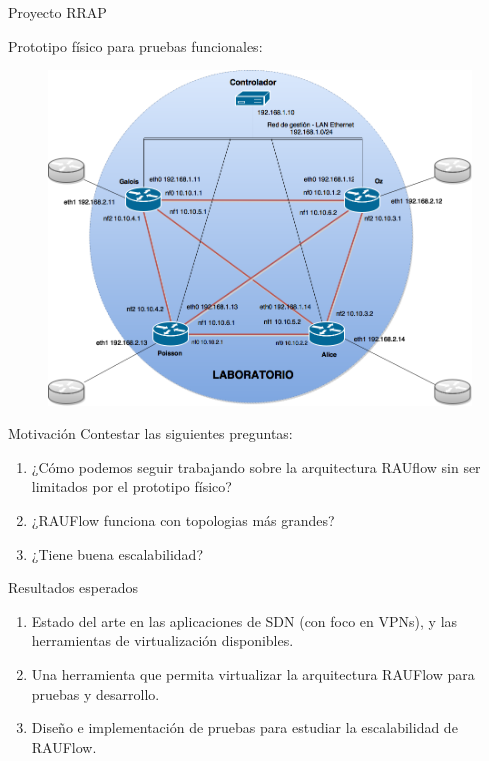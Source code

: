 \documentclass[xcolor=svgnames]{beamer}
\begin{document}
\begin{frame}{Proyecto RRAP}
	\begin{center}
		Prototipo físico para pruebas funcionales:
		\begin{figure}[t]
			\includegraphics[scale=0.25]{topologia_rrap}
		\end{figure}
	\end{center}
\end{frame}

\begin{frame}{Motivación}
	Contestar las siguientes preguntas:
	\pause
	\begin{enumerate}
		\item ¿Cómo podemos seguir trabajando sobre la arquitectura RAUflow sin ser limitados por el prototipo físico?
		\pause
		\item ¿RAUFlow funciona con topologias más grandes?
		\pause
		\item ¿Tiene buena escalabilidad?
	\end{enumerate}
\end{frame}

\begin{frame}{Resultados esperados}
	\pause
	\begin{enumerate}
		\item Estado del arte en las aplicaciones de SDN (con foco en VPNs), y las herramientas de virtualización disponibles.
		\pause
		\item Una herramienta que permita virtualizar la arquitectura RAUFlow para pruebas y desarrollo.
		\pause
		\item Diseño e implementación de pruebas para estudiar la escalabilidad de RAUFlow.
	\end{enumerate}
\end{frame}
\end{document}
